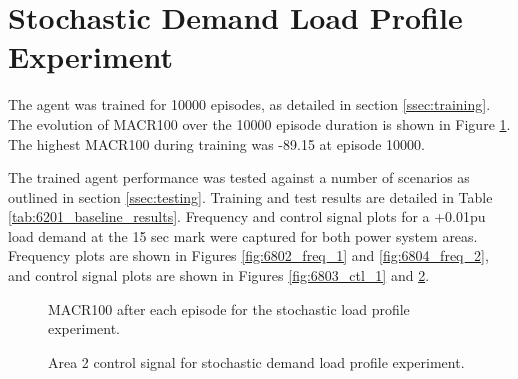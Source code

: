 \section{Stochastic Demand Load Profile Experiment}
The agent was trained for 10000 episodes, as detailed in section \ref{ssec:training}. The evolution of MACR100 over the 10000 episode duration is shown in Figure \ref{fig:6801_average_reward}. The highest MACR100 during training was -89.15 at episode 10000.

The trained agent performance was tested against a number of scenarios as outlined in section \ref{ssec:testing}. Training and test results are detailed in Table \ref{tab:6201_baseline_results}. Frequency and control signal plots for a +0.01pu load demand at the 15 sec mark were captured for both power system areas. Frequency plots are shown in Figures \ref{fig:6802_freq_1} and \ref{fig:6804_freq_2}, and control signal plots are shown in Figures \ref{fig:6803_ctl_1} and \ref{fig:6805_ctl_2}.

\vspace{2cm}

\begin{figure}[h]
	\centering
	
	\caption{MACR100 after each episode for the stochastic load profile experiment.}\label{fig:6801_average_reward}
\end{figure}



\begin{figure}[h]
	\centering
	
	
	\vspace{-0.5cm}
	\caption{Area 1 frequency response for stochastic demand load profile experiment.}\label{fig:6802_freq_1}
	
	\vspace{0.5cm}
	
	
	\vspace{-0.5cm}
	\caption{Area 1 control signal for stochastic demand load profile experiment.}\label{fig:6803_ctl_1}
	
	\vspace{0.5cm}
	
	
	\vspace{-0.5cm}
	\caption{Area 2 frequency response for stochastic demand load profile experiment.}\label{fig:6804_freq_2}
	
	\vspace{0.5cm}
			
	
	\vspace{-0.5cm}
	\caption{Area 2 control signal for stochastic demand load profile experiment.}\label{fig:6805_ctl_2}
\end{figure}